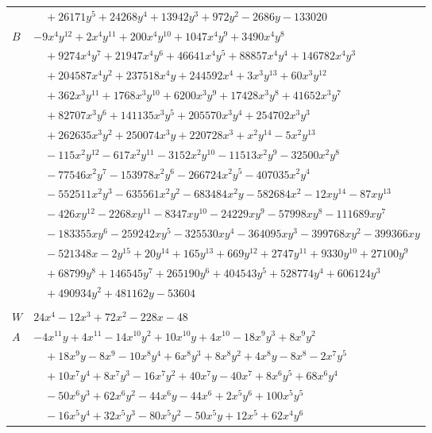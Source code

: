 \documentclass[11pt]{article}
\begin{document}
\begin{longtable}{@{}ll@{}}
 & $\quad +26171y^{5}+24268y^{4}+13942y^{3}+972y^{2}-2686y-133020$\\
$B$ & $-9x^{4}y^{12}+2x^{4}y^{11}+200x^{4}y^{10}+1047x^{4}y^{9}+3490x^{4}y^{8}$\\
 & $\quad +9274x^{4}y^{7}+21947x^{4}y^{6}+46641x^{4}y^{5}+88857x^{4}y^{4}+146782x^{4}y^{3}$\\
 & $\quad +204587x^{4}y^{2}+237518x^{4}y+244592x^{4}+3x^{3}y^{13}+60x^{3}y^{12}$\\
 & $\quad +362x^{3}y^{11}+1768x^{3}y^{10}+6200x^{3}y^{9}+17428x^{3}y^{8}+41652x^{3}y^{7}$\\
 & $\quad +82707x^{3}y^{6}+141135x^{3}y^{5}+205570x^{3}y^{4}+254702x^{3}y^{3}$\\
 & $\quad +262635x^{3}y^{2}+250074x^{3}y+220728x^{3}+x^{2}y^{14}-5x^{2}y^{13}$\\
 & $\quad -115x^{2}y^{12}-617x^{2}y^{11}-3152x^{2}y^{10}-11513x^{2}y^{9}-32500x^{2}y^{8}$\\
 & $\quad -77546x^{2}y^{7}-153978x^{2}y^{6}-266724x^{2}y^{5}-407035x^{2}y^{4}$\\
 & $\quad -552511x^{2}y^{3}-635561x^{2}y^{2}-683484x^{2}y-582684x^{2}-12xy^{14}-87xy^{13}$\\
 & $\quad -426xy^{12}-2268xy^{11}-8347xy^{10}-24229xy^{9}-57998xy^{8}-111689xy^{7}$\\
 & $\quad -183355xy^{6}-259242xy^{5}-325530xy^{4}-364095xy^{3}-399768xy^{2}-399366xy$\\
 & $\quad -521348x-2y^{15}+20y^{14}+165y^{13}+669y^{12}+2747y^{11}+9330y^{10}+27100y^{9}$\\
 & $\quad +68799y^{8}+146545y^{7}+265190y^{6}+404543y^{5}+528774y^{4}+606124y^{3}$\\
 & $\quad +490934y^{2}+481162y-53604$\\
\addlinespace[3pt]
\multicolumn{2}{@{}l}{$g=2$, $i=5$, $m=1$, neighbours $1,2,4,6,13,14,20,21,23,26,32,41$}\\
$W$ & $24x^{4}-12x^{3}+72x^{2}-228x-48$\\
$A$ & $-4x^{11}y+4x^{11}-14x^{10}y^{2}+10x^{10}y+4x^{10}-18x^{9}y^{3}+8x^{9}y^{2}$\\
 & $\quad +18x^{9}y-8x^{9}-10x^{8}y^{4}+6x^{8}y^{3}+8x^{8}y^{2}+4x^{8}y-8x^{8}-2x^{7}y^{5}$\\
 & $\quad +10x^{7}y^{4}+8x^{7}y^{3}-16x^{7}y^{2}+40x^{7}y-40x^{7}+8x^{6}y^{5}+68x^{6}y^{4}$\\
 & $\quad -50x^{6}y^{3}+62x^{6}y^{2}-44x^{6}y-44x^{6}+2x^{5}y^{6}+100x^{5}y^{5}$\\
 & $\quad -16x^{5}y^{4}+32x^{5}y^{3}-80x^{5}y^{2}-50x^{5}y+12x^{5}+62x^{4}y^{6}$\\

\end{longtable}
\end{document}
